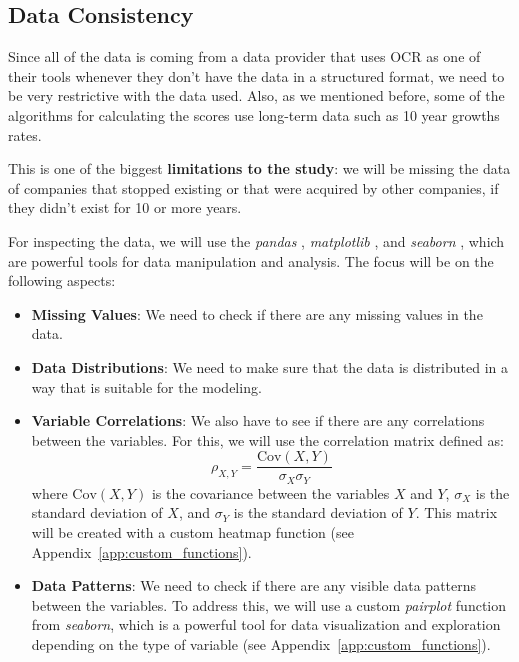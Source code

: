 \documentclass[11pt,english,a4paper,hidelinks]{book}
\begin{document}
\subsection{Data Consistency}

Since all of the data is coming from a data provider that uses OCR as one of their tools whenever they don't have the data in a structured format, we need to be very restrictive with the data used. Also, as we mentioned before, some of the algorithms for calculating the scores use long-term data such as 10 year growths rates.

\vspace{0.5cm}
\noindent This is one of the biggest \textbf{limitations to the study}: we will be missing the data of companies that stopped existing or that were acquired by other companies, if they didn't exist for 10 or more years.

\vspace{0.5cm}
\noindent For inspecting the data, we will use the \textit{pandas} \cite{pandas2024}, \textit{matplotlib} \cite{matplotlib2025doc}, and \textit{seaborn} \cite{seaborn2024}, which are powerful tools for data manipulation and analysis. The focus will be on the following aspects:
\begin{itemize}
  \item \textbf{Missing Values}: We need to check if there are any missing values in the data.
  \item \textbf{Data Distributions}: We need to make sure that the data is distributed in a way that is suitable for the modeling.
  \item \textbf{Variable Correlations}: We also have to see if there are any correlations between the variables. For this, we will use the correlation matrix defined as:
  \begin{equation}
    \rho_{X,Y} = \frac{\text{Cov}(X,Y)}{\sigma_X \sigma_Y}
  \end{equation}
  where \(\text{Cov}(X,Y)\) is the covariance between the variables \(X\) and \(Y\), \(\sigma_X\) is the standard deviation of \(X\), and \(\sigma_Y\) is the standard deviation of \(Y\). This matrix will be created with a custom heatmap function (see Appendix~\ref{app:custom_functions}).
  \item \textbf{Data Patterns}: We need to check if there are any visible data patterns between the variables. To address this, we will use a custom \textit{pairplot} function from \textit{seaborn}, which is a powerful tool for data visualization and exploration  depending on the type of variable (see Appendix~\ref{app:custom_functions}).
\end{itemize}
\end{document}
